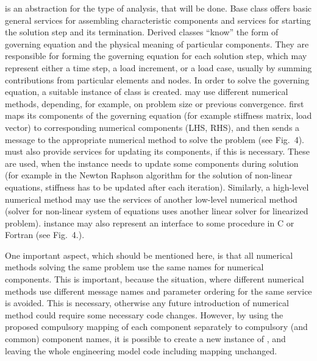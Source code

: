 \begin{htmlonly}
\begin{center}
 is an abstraction for the type of analysis, that will be
done. Base class offers basic general services for assembling
characteristic components and services for starting the solution step and
its termination. Derived classes ``know'' the form of governing
equation and the physical meaning of  particular components. 
They are responsible for forming the governing equation for each solution
step, which may represent either a time step, a load increment, or a load
case, usually by summing contributions from particular elements and nodes.
In order
to solve the governing equation, a suitable instance of 
class is created.  may use different numerical methods,
depending, for example, on problem size or previous convergence.  first maps its components of the governing equation (for example
stiffness matrix, load vector) to corresponding numerical components
(LHS, RHS), and then sends a message to the appropriate numerical method to solve the
problem (see Fig.~4). 
 must also provide services for updating its
components, if this is necessary. These are used, when the  instance needs to update  some components during solution (for
example in the Newton Raphson algorithm for the solution of non-linear
equations, stiffness has to be updated after each
iteration). Similarly,  
a high-level numerical method may use the services of another
low-level numerical method (solver for non-linear system  of equations
uses another linear solver for linearized problem). 
instance may also represent an interface to some procedure in C or
Fortran (see Fig.~4.). 



One important aspect, which should be mentioned here, is that all
numerical methods solving the same problem use the same names for numerical
components. This is important, because the
situation, where different numerical methods use different message
names and parameter ordering for the same service is avoided. This is
necessary, otherwise any future introduction of numerical method
could require some necessary code changes. However, by using the
proposed compulsory mapping of each component separately to
compulsory (and common) component names, it is possible to create a new
instance of , and leaving the whole engineering model code
including mapping unchanged. 


\end{center}
\end{htmlonly}
